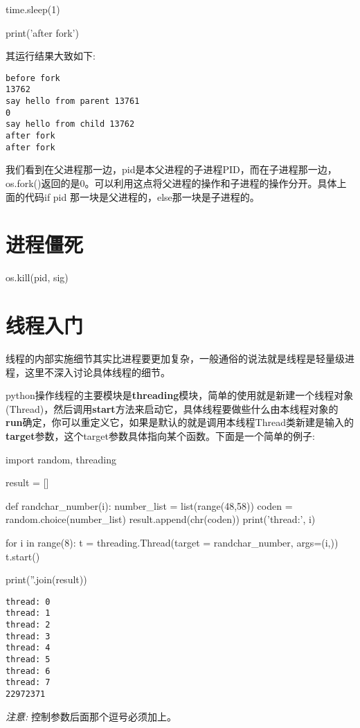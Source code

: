 \documentclass[12pt,oneside]{book}
\begin{document}
\begin{common-format}
\begin{tcbpython}[]
time.sleep(1)

print('after fork')
\end{tcbpython}

其运行结果大致如下:

\begin{Verbatim}
before fork 
13762
say hello from parent 13761
0
say hello from child 13762
after fork
after fork
\end{Verbatim}

我们看到在父进程那一边，pid是本父进程的子进程PID，而在子进程那一边，os.fork()返回的是0。可以利用这点将父进程的操作和子进程的操作分开。具体上面的代码if pid 那一块是父进程的，else那一块是子进程的。




\section{进程僵死}

os.kill(pid, sig)


\section{线程入门}
线程的内部实施细节其实比进程要更加复杂，一般通俗的说法就是线程是轻量级进程，这里不深入讨论具体线程的细节。

python操作线程的主要模块是\textbf{threading}模块，简单的使用就是新建一个线程对象(Thread)，然后调用\textbf{start}方法来启动它，具体线程要做些什么由本线程对象的\textbf{run}确定，你可以重定义它，如果是默认的就是调用本线程Thread类新建是输入的\textbf{target}参数，这个target参数具体指向某个函数。下面是一个简单的例子: 

\begin{tcbpython}[]
import random, threading

result = []

def randchar_number(i):
    number_list = list(range(48,58))
    coden = random.choice(number_list)
    result.append(chr(coden))
    print('thread:', i)

for i in range(8):
    t = threading.Thread(target = randchar_number, args=(i,))
    t.start()

print(''.join(result))
\end{tcbpython}

\begin{Verbatim}
thread: 0
thread: 1
thread: 2
thread: 3
thread: 4
thread: 5
thread: 6
thread: 7
22972371
\end{Verbatim}


\emph{注意: } 控制参数后面那个逗号必须加上。


\end{common-format}
\end{document}
